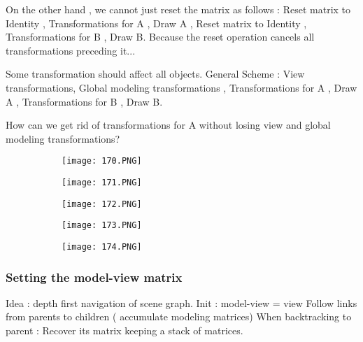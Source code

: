 \documentclass{article}
\begin{document}
On the other hand , we cannot just reset the matrix as follows : Reset matrix to Identity , Transformations for A , Draw A , Reset matrix to Identity , Transformations for B , Draw B.
Because the reset operation cancels all transformations preceding it...

Some transformation should affect all objects.
General Scheme : 
View transformations, Global modeling transformations , Transformations for A , Draw A , Transformations for B  , Draw B.

How can we get rid of transformations for A without losing view and global modeling transformations?


\begin{figure}[ht!]
  \centering
  \begin{subfigure}[b]{0.4\linewidth}
    \texttt{[image: 170.PNG]}
  \end{subfigure}
  \begin{subfigure}[b]{0.4\textwidth}
         \centering
         \texttt{[image: 171.PNG]}
     \end{subfigure}
\end{figure}


\begin{figure}[ht!]
  \centering
  \begin{subfigure}[b]{0.4\linewidth}
    \texttt{[image: 172.PNG]}
  \end{subfigure}
  \begin{subfigure}[b]{0.4\textwidth}
         \centering
         \texttt{[image: 173.PNG]}
     \end{subfigure}
\end{figure}

\begin{figure}[ht!]
  \centering
  \begin{subfigure}[b]{0.45\linewidth}
    \texttt{[image: 174.PNG]}
  \end{subfigure}
\end{figure}


\vspace{60mm}

\subsubsection{Setting the model-view matrix}

Idea : depth first navigation of scene graph. 
Init : model-view = view
Follow links from parents to children ( accumulate modeling matrices)
When backtracking to parent : Recover its matrix keeping a stack of matrices.
\end{document}
